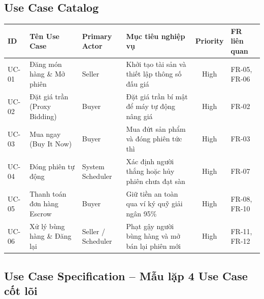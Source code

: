 \documentclass[11pt,a4paper]{article}
\begin{document}
\subsection{Use Case Catalog}
\begin{table}[H]
    \centering
    \small
    \begin{tabularx}{\textwidth}{|l|l|l|X|c|l|}
        \hline
        \textbf{ID} & \textbf{Tên Use Case} & \textbf{Primary Actor} & \textbf{Mục tiêu nghiệp vụ} & \textbf{Priority} & \textbf{FR liên quan} \\ \hline
        UC-01 & Đăng món hàng \& Mở phiên & Seller & Khởi tạo tài sản và thiết lập thông số đấu giá & High & FR-05, FR-06 \\ \hline
        UC-02 & Đặt giá trần (Proxy Bidding) & Buyer & Đặt giá trần bí mật để máy tự động nâng giá & High & FR-02 \\ \hline
        UC-03 & Mua ngay (Buy It Now) & Buyer & Mua đứt sản phẩm và đóng phiên tức thì & High & FR-03 \\ \hline
        UC-04 & Đóng phiên tự động & System Scheduler & Xác định người thắng hoặc hủy phiên chưa đạt sàn & High & FR-07 \\ \hline
        UC-05 & Thanh toán đơn hàng Escrow & Buyer & Giữ tiền an toàn qua ví ký quỹ giải ngân 95\% & High & FR-08, FR-10 \\ \hline
        UC-06 & Xử lý bùng hàng \& Đăng lại & Seller / Scheduler & Phạt gậy người bùng hàng và mở bán lại phiên mới & High & FR-11, FR-12 \\ \hline
    \end{tabularx}
\end{table}

\subsection{Use Case Specification -- Mẫu lặp 4 Use Case cốt lõi}
\end{document}
